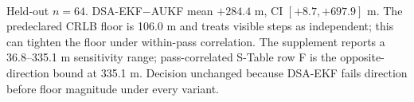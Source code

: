 \begin{table}[t]
  \centering\small
  \caption{Long-arc higher-fidelity force-and-density-mismatch result. DSA-EKF fails its predeclared positive criterion because AUKF is the best non-DSA estimator and the DSA-EKF$-$AUKF interval is positive. The auxiliary EKF/AUKF stress observation is retained only as supplementary stress context.}
  \label{tab:main_long_arc_result}
  \\[2pt]{\footnotesize Held-out \(n=64\). DSA-EKF$-$AUKF mean \(+284.4\) m, CI \([+8.7,+697.9]\) m. The predeclared CRLB floor is 106.0 m and treats visible steps as independent; this can tighten the floor under within-pass correlation. The supplement reports a 36.8--335.1 m sensitivity range; pass-correlated S-Table row F is the opposite-direction bound at 335.1 m. Decision unchanged because DSA-EKF fails direction before floor magnitude under every variant.}
\end{table}